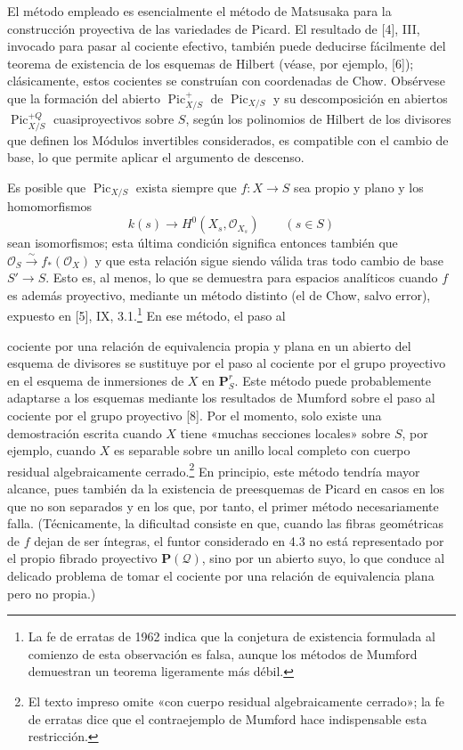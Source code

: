  El método empleado es esencialmente el método de
Matsusaka para la construcción proyectiva de las variedades de Picard. El
resultado de [4], III, invocado para pasar al cociente efectivo, también puede
deducirse fácilmente del teorema de existencia de los esquemas de Hilbert
(véase, por ejemplo, [6]); clásicamente, estos cocientes se construían con
coordenadas de Chow. Obsérvese que la formación del abierto
$\operatorname{Pic}^{+}_{X/S}$ de $\operatorname{Pic}_{X/S}$ y su
descomposición en abiertos $\operatorname{Pic}^{+Q}_{X/S}$ cuasiproyectivos
sobre $S$, según los polinomios de Hilbert de los divisores que definen los
Módulos invertibles considerados, es compatible con el cambio de base, lo que
permite aplicar el argumento de descenso.

 Es posible que $\operatorname{Pic}_{X/S}$ exista
siempre que $f:X\longrightarrow S$ sea propio y plano y los homomorfismos
\[
k(s)\longrightarrow H^0(X_s,\mathcal O_{X_s})\qquad(s\in S)
\]
sean isomorfismos; esta última condición significa entonces también que
$\mathcal O_S\xrightarrow{\sim}f_*(\mathcal O_X)$ y que esta relación sigue
siendo válida tras todo cambio de base $S'\longrightarrow S$. Esto es, al
menos, lo que se demuestra para espacios analíticos cuando $f$ es además
proyectivo, mediante un método distinto (el de Chow, salvo error), expuesto en
[5], IX, 3.1.\footnote{La fe de erratas de 1962 indica que la conjetura de existencia
formulada al comienzo de esta observación es falsa, aunque los métodos de
Mumford demuestran un teorema ligeramente más débil.} En ese método, el paso al

cociente por una relación de equivalencia propia y plana en un abierto del
esquema de divisores se sustituye por el paso al cociente por el grupo
proyectivo en el esquema de inmersiones de $X$ en $\mathbf P^r_S$. Este método
puede probablemente adaptarse a los esquemas mediante los resultados de
Mumford sobre el paso al cociente por el grupo proyectivo [8]. Por el momento,
solo existe una demostración escrita cuando $X$ tiene «muchas secciones
locales» sobre $S$, por ejemplo, cuando $X$ es separable sobre un anillo local
completo con cuerpo residual algebraicamente
cerrado.\footnote{El texto impreso omite «con cuerpo residual algebraicamente
cerrado»; la fe de erratas dice que el contraejemplo de Mumford hace indispensable
esta restricción.} En principio, este método tendría mayor alcance, pues también
da la existencia de preesquemas de Picard en casos en los que no son separados
y en los que, por tanto, el primer método necesariamente falla. (Técnicamente,
la dificultad consiste en que, cuando las fibras geométricas de $f$ dejan de
ser íntegras, el funtor considerado en 4.3 no está representado por el propio
fibrado proyectivo $\mathbf P(\mathcal Q)$, sino por un abierto suyo, lo que
conduce al delicado problema de tomar el cociente por una relación de
equivalencia plana pero no propia.)


